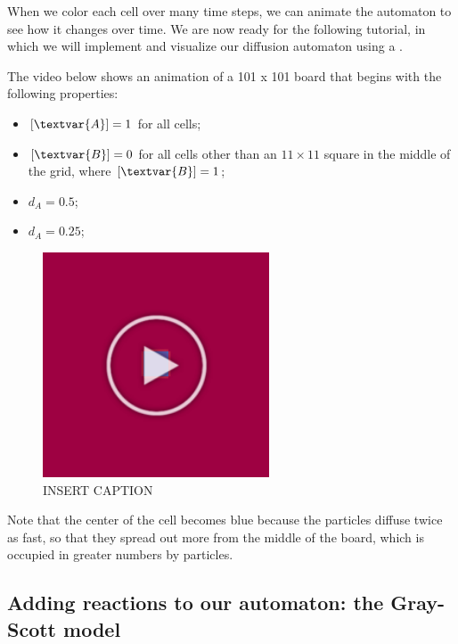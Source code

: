 When we color each cell over many time steps, we can animate the automaton to see how it changes over time. We are now ready for the following tutorial, in which we will implement and visualize our diffusion automaton using a .


The video below shows an animation of a 101 x 101 board that begins with the following properties:
\begin{itemize}
\item $[\textvar{A}] = 1$ for all cells;
\item $[\textvar{B}] = 0$ for all cells other than an $11 \times 11$ square in the middle of the grid, where $[\textvar{B}] = 1$;
\item $d_A = 0.5$;
\item $d_A = 0.25$;
\end{itemize}

\begin{figure}[h]
\centering
\mySfFamily
\includegraphics[width = 0.6\textwidth]{../images/diffusion_movie_first_frame.png}
\caption{INSERT CAPTION}
\label{fig:diffusion_movie_first_frame}
\end{figure}

Note that the center of the cell becomes blue because the  particles diffuse twice as fast, so that they spread out more from the middle of the board, which is occupied in greater numbers by  particles.

\FloatBarrier
{}
\subsection{Adding reactions to our automaton: the Gray-Scott model}

